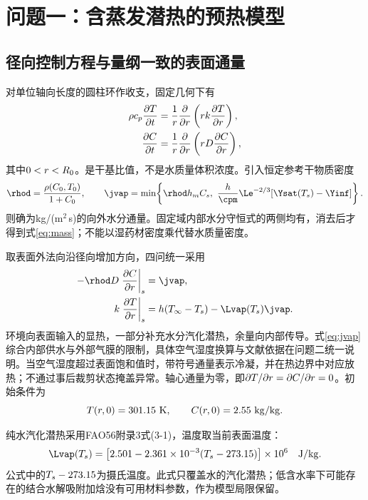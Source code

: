 \section{问题一：含蒸发潜热的预热模型}
\subsection{径向控制方程与量纲一致的表面通量}
对单位轴向长度的圆柱环作收支，固定几何下有
\begin{align}
\rho c_p\frac{\partial T}{\partial t}
 &=\frac{1}{r}\frac{\partial}{\partial r}
 \left(rk\frac{\partial T}{\partial r}\right),\label{eq:heat}\\
\frac{\partial C}{\partial t}
 &=\frac{1}{r}\frac{\partial}{\partial r}
 \left(rD\frac{\partial C}{\partial r}\right),\label{eq:mass}
\end{align}
其中$0<r<R_0$。\C{}是干基比值，不是水质量体积浓度。引入恒定参考干物质密度
\begin{equation}
\rhod=\frac{\rho(\C_0,\T_0)}{1+\C_0},\qquad
\jvap=\min\!\left\{\rhod\hmass\C_s,\ \frac{\hconv}{\cpm}\Le^{-2/3}[\Ysat(\T_s)-\Yinf]\right\}.\label{eq:jvap}
\end{equation}
则\jvap{}确为kg/(m$^2$\,s)的向外水分通量。固定域内部水分守恒式的两侧均有\rhod{}，消去后才得到式\eqref{eq:mass}；不能以湿药材密度乘\C{}代替水质量密度。

取表面外法向沿径向增加方向，四问统一采用
\begin{align}
-\rhod\Ddiff\left.\frac{\partial\C}{\partial\rpos}\right|_s
 &=\jvap,\label{eq:bcC}\\
\kcond\left.\frac{\partial\T}{\partial\rpos}\right|_s
 &=\hconv(\Tinf-\T_s)-\Lvap(\T_s)\jvap.\label{eq:bcT}
\end{align}
环境向表面输入的显热，一部分补充水分汽化潜热，余量向内部传导。式\eqref{eq:jvap}综合内部供水与外部气膜的限制，具体空气湿度换算与文献依据在问题二统一说明。当空气湿度超过表面饱和值时，带符号通量表示冷凝，并在热边界中对应放热；不通过事后裁剪状态掩盖异常。轴心通量为零，即$\partial T/\partial r=\partial C/\partial r=0$。初始条件为
\begin{equation}
T(r,0)=301.15~\mathrm{K},\qquad C(r,0)=2.55~\mathrm{kg/kg}.
\end{equation}

纯水汽化潜热采用FAO56附录3式(3-1)\cite{fao56}，温度取当前表面温度：
\begin{equation}
\Lvap(\T_s)=\left[2.501-2.361\times10^{-3}(\T_s-273.15)\right]\times10^6
\quad\mathrm{J/kg}.\label{eq:latent}
\end{equation}
公式中的$T_s-273.15$为摄氏温度。此式只覆盖水的汽化潜热；低含水率下可能存在的结合水解吸附加焓没有可用材料参数，作为模型局限保留。

